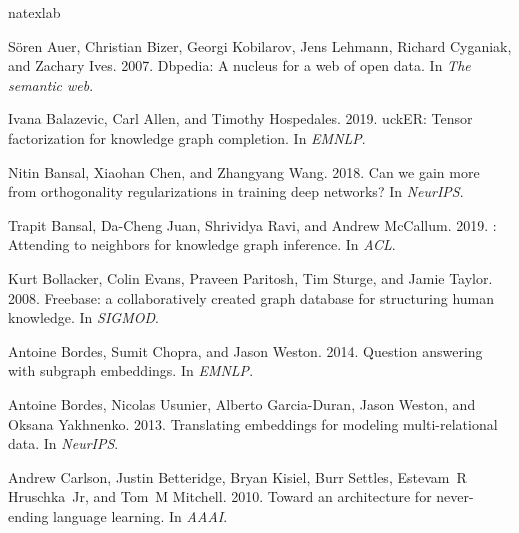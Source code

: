 \documentclass[11pt,a4paper]{article}
\begin{document}
\begin{thebibliography}{34}
\expandafter\ifx\csname natexlab\endcsname\relax\def\natexlab#1{#1}\fi

S{\"o}ren Auer, Christian Bizer, Georgi Kobilarov, Jens Lehmann, Richard
  Cyganiak, and Zachary Ives. 2007.
\newblock Dbpedia: A nucleus for a web of open data.
\newblock In \emph{The semantic web}.

Ivana Balazevic, Carl Allen, and Timothy Hospedales. 2019.
uck{ER}: Tensor factorization for knowledge graph completion.
\newblock In \emph{EMNLP}.

Nitin Bansal, Xiaohan Chen, and Zhangyang Wang. 2018.
\newblock Can we gain more from orthogonality regularizations in training deep
  networks?
\newblock In \emph{NeurIPS}.

Trapit Bansal, Da-Cheng Juan, Shrividya Ravi, and Andrew McCallum. 2019.
: Attending to neighbors for knowledge graph inference.
\newblock In \emph{ACL}.

Kurt Bollacker, Colin Evans, Praveen Paritosh, Tim Sturge, and Jamie Taylor.
  2008.
\newblock Freebase: a collaboratively created graph database for structuring
  human knowledge.
\newblock In \emph{SIGMOD}.

Antoine Bordes, Sumit Chopra, and Jason Weston. 2014.
\newblock Question answering with subgraph embeddings.
\newblock In \emph{EMNLP}.

Antoine Bordes, Nicolas Usunier, Alberto Garcia-Duran, Jason Weston, and Oksana
  Yakhnenko. 2013.
\newblock Translating embeddings for modeling multi-relational data.
\newblock In \emph{NeurIPS}.

Andrew Carlson, Justin Betteridge, Bryan Kisiel, Burr Settles, Estevam~R
  Hruschka~Jr, and Tom~M Mitchell. 2010.
\newblock Toward an architecture for never-ending language learning.
\newblock In \emph{AAAI}.


\end{thebibliography}
\end{document}
